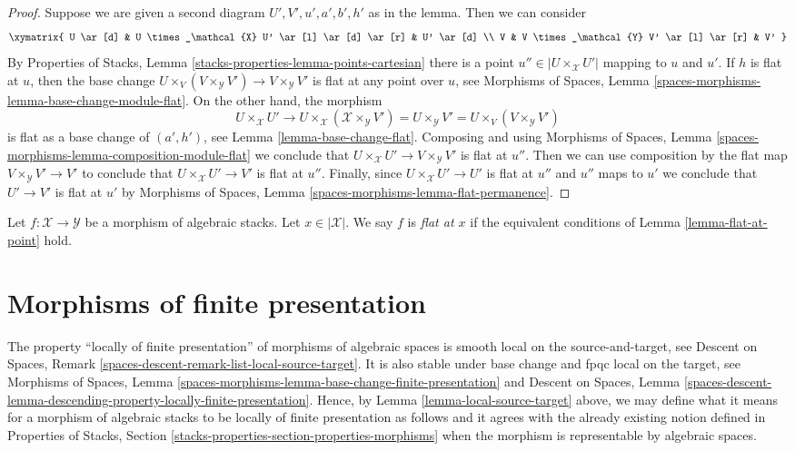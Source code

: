 \begin{proof}
Suppose we are given a second diagram $U', V', u', a', b', h'$ as
in the lemma. Then we can consider
$$
\xymatrix{
U \ar[d] & U \times_\mathcal{X} U' \ar[l] \ar[d] \ar[r] & U' \ar[d] \\
V & V \times_\mathcal{Y} V' \ar[l] \ar[r] & V'
}
$$
By Properties of Stacks, Lemma \ref{stacks-properties-lemma-points-cartesian}
there is a point $u'' \in |U \times_\mathcal{X} U'|$ mapping
to $u$ and $u'$. If $h$ is flat at $u$, then the base change
$U \times_V (V \times_\mathcal{Y} V') \to V \times_\mathcal{Y} V'$
is flat at any point over $u$, see
Morphisms of Spaces, Lemma \ref{spaces-morphisms-lemma-base-change-module-flat}.
On the other hand, the morphism
$$
U \times_\mathcal{X} U' \to
U \times_\mathcal{X} (\mathcal{X} \times_\mathcal{Y} V') =
U \times_\mathcal{Y} V' =
U \times_V (V \times_\mathcal{Y} V')
$$
is flat as a base change of $(a', h')$, see Lemma \ref{lemma-base-change-flat}.
Composing and using
Morphisms of Spaces, Lemma \ref{spaces-morphisms-lemma-composition-module-flat}
we conclude that $U \times_\mathcal{X} U' \to V \times_\mathcal{Y} V'$
is flat at $u''$. Then we can use composition by the flat map
$V \times_\mathcal{Y} V' \to V'$ to conclude that
$U \times_\mathcal{X} U' \to V'$ is flat at $u''$.
Finally, since $U \times_\mathcal{X} U' \to U'$ is flat
at $u''$ and $u''$ maps to $u'$ we conclude that
$U' \to V'$ is flat at $u'$ by
Morphisms of Spaces, Lemma \ref{spaces-morphisms-lemma-flat-permanence}.
\end{proof}

\begin{definition}
\label{definition-flat-at-point}
Let $f : \mathcal{X} \to \mathcal{Y}$ be a morphism of algebraic stacks.
Let $x \in |\mathcal{X}|$. We say $f$ is {\it flat at $x$} if the
equivalent conditions of Lemma \ref{lemma-flat-at-point} hold.
\end{definition}





\section{Morphisms of finite presentation}
\label{section-finite-presentation}

\noindent
The property ``locally of finite presentation'' of morphisms of algebraic
spaces is smooth local on the source-and-target, see
Descent on Spaces, Remark \ref{spaces-descent-remark-list-local-source-target}.
It is also stable under base change and fpqc local on the target, see
Morphisms of Spaces,
Lemma \ref{spaces-morphisms-lemma-base-change-finite-presentation}
and
Descent on Spaces, Lemma
\ref{spaces-descent-lemma-descending-property-locally-finite-presentation}.
Hence, by
Lemma \ref{lemma-local-source-target}
above, we may define what it means for a morphism of algebraic stacks
to be locally of finite presentation as follows and it agrees with the already
existing notion defined in
Properties of Stacks,
Section \ref{stacks-properties-section-properties-morphisms}
when the morphism is representable by algebraic spaces.

